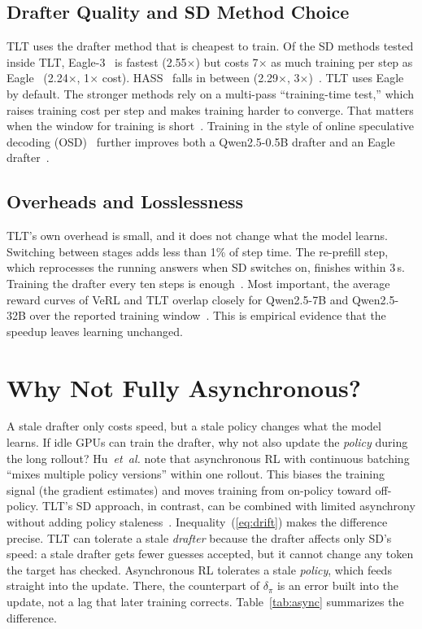 \documentclass[conference]{IEEEtran}
\newcommand{\x}{\ensuremath{\times}}
\begin{document}
\subsection{Drafter Quality and SD Method Choice}
TLT uses the drafter method that is cheapest to train. Of the SD methods tested inside TLT, Eagle-3~\cite{li2025eagle3} is fastest (2.55\x) but costs 7\x{} as much training per step as Eagle~\cite{li2024eagle} (2.24\x, 1\x{} cost). HASS~\cite{zhang2025hass} falls in between (2.29\x, 3\x)~\cite[Table~7]{hu2026tlt}. TLT uses Eagle by default. The stronger methods rely on a multi-pass ``training-time test,'' which raises training cost per step and makes training harder to converge. That matters when the window for training is short~\cite[Sec.~6.5]{hu2026tlt}. Training in the style of online speculative decoding (OSD)~\cite{liu2024osd} further improves both a Qwen2.5-0.5B drafter and an Eagle drafter~\cite[Table~8]{hu2026tlt}.

\subsection{Overheads and Losslessness}
TLT's own overhead is small, and it does not change what the model learns. Switching between stages adds less than 1\% of step time. The re-prefill step, which reprocesses the running answers when SD switches on, finishes within 3\,s. Training the drafter every ten steps is enough~\cite[Sec.~6.4]{hu2026tlt}. Most important, the average reward curves of VeRL and TLT overlap closely for Qwen2.5-7B and Qwen2.5-32B over the reported training window~\cite[Fig.~12]{hu2026tlt}. This is empirical evidence that the speedup leaves learning unchanged.

\section{Why Not Fully Asynchronous?}
\label{sec:async}

A stale drafter only costs speed, but a stale policy changes what the model learns. If idle GPUs can train the drafter, why not also update the \emph{policy} during the long rollout? Hu~\emph{et~al.} note that asynchronous RL with continuous batching ``mixes multiple policy versions'' within one rollout. This biases the training signal (the gradient estimates) and moves training from on-policy toward off-policy. TLT's SD approach, in contrast, can be combined with limited asynchrony without adding policy staleness~\cite[Sec.~7]{hu2026tlt}. Inequality~(\ref{eq:drift}) makes the difference precise. TLT can tolerate a stale \emph{drafter} because the drafter affects only SD's speed: a stale drafter gets fewer guesses accepted, but it cannot change any token the target has checked. Asynchronous RL tolerates a stale \emph{policy}, which feeds straight into the update. There, the counterpart of $\delta_\pi$ is an error built into the update, not a lag that later training corrects. Table~\ref{tab:async} summarizes the difference.
\end{document}
